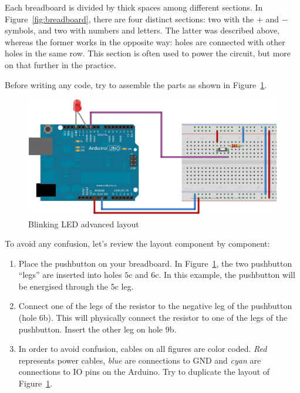 Each breadboard is divided by thick spaces among different sections. In Figure~\ref{fig:breadboard}, there are four distinct sections: two with the $+$ and $-$ symbols, and two with numbers and letters. The latter was described above, whereas the former works in the opposite way: holes are connected with other holes in the same row. This section is often used to power the circuit, but more on that further in the practice.

Before writing any code, try to assemble the parts as shown in Figure~\ref{fig:blinkingLEDAdvancedLayout}.

\begin{figure}[htbp]
  \centering
  \includegraphics[width=0.9\linewidth]{figures/blinkingLEDAdvanced-NEW.eps}
  \caption{Blinking LED advanced layout
  \label{fig:blinkingLEDAdvancedLayout}}
\end{figure}

To avoid any confusion, let's review the layout component by component:

\begin{enumerate}
	\item Place the pushbutton on your breadboard. In Figure~\ref{fig:blinkingLEDAdvancedLayout}, the two pushbutton ``legs'' are inserted into holes $5$c and $6$c. In this example, the pushbutton will be energised through the $5$c leg.
	\item Connect one of the legs of the resistor to the negative leg of the pushbutton (hole $6$b). This will physically connect the resistor to one of the legs of the pushbutton. Insert the other leg on hole $9$b.
	\item In order to avoid confusion, cables on all figures are color coded. \emph{Red} represents power cables, \emph{blue} are connections to GND and \emph{cyan} are connections to IO pins on the Arduino. Try to duplicate the layout of Figure~\ref{fig:blinkingLEDAdvancedLayout}.
\end{enumerate}

